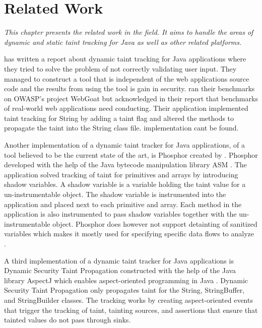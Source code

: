 \chapter{Related Work}
\label{RW}
\textit{This chapter presents the related work in the field. It aims to handle the areas of dynamic and static taint tracking for Java as well as other related platforms.}

\textcite{Haldar} has written a report about dynamic taint tracking for Java applications where they tried to solve the problem of not correctly validating user input. They managed to construct a tool that is independent of the web applications source code and the results from using the tool is gain in security. \textcite{Haldar} ran their benchmarks on OWASP’s project WebGoat \parencite{webgoat} but acknowledged in their report that benchmarks of real-world web applications need conducting. Their application implemented taint tracking for String by adding a taint flag and altered the methods to propagate the taint into the String class file. \textcite{Haldar} implementation cant be found.

Another implementation of a dynamic taint tracker for Java applications, of a tool believed to be the current state of the art, is Phosphor \parencite{phosphor} created by \textcite{BellJ.2014PIdd}. Phosphor developed with the help of the Java bytecode manipulation library ASM \parencite{asm}. The application solved tracking of taint for primitives and arrays by introducing shadow variables. A shadow variable is a variable holding the taint value for a un-instrumentable object. The shadow variable is instrumented into the application and placed next to each primitive and array. Each method in the application is also instrumented to pass shadow variables together with the un-instrumentable object. Phosphor does however not support detainting of sanitized variables which makes it mostly used for specifying specific data flows to analyze \parencite{BellJ.2014PIdd}. 

A third implementation of a dynamic taint tracker for Java applications is Dynamic Security Taint Propagation \parencite{securityTaint} constructed with the help of the Java library AspectJ which enables aspect-oriented programming in Java \parencite{aspectj}. Dynamic Security Taint Propagation only propagates taint for the String, StringBuffer, and StringBuilder classes. The tracking works by creating aspect-oriented events that trigger the tracking of taint, tainting sources, and assertions that ensure that tainted values do not pass through sinks.

